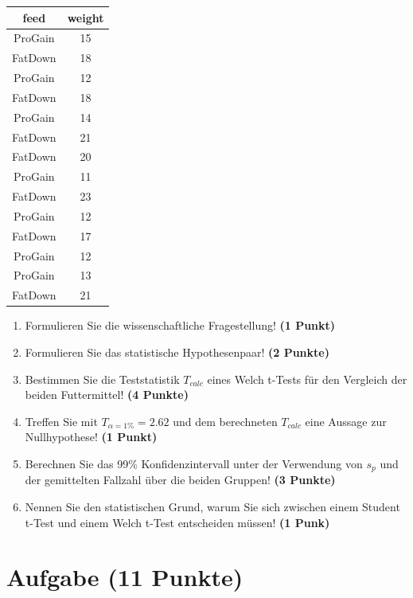 \documentclass[a4paper, 9pt]{scrartcl}\usepackage[]{graphicx}\usepackage[]{xcolor}
\begin{document}
\begin{table}[!h]
\centering
\begin{tabular}{cc}
\toprule
feed & weight\\
\midrule
ProGain & 15\\
FatDown & 18\\
ProGain & 12\\
FatDown & 18\\
ProGain & 14\\
\addlinespace
FatDown & 21\\
FatDown & 20\\
ProGain & 11\\
FatDown & 23\\
ProGain & 12\\
\addlinespace
FatDown & 17\\
ProGain & 12\\
ProGain & 13\\
FatDown & 21\\
\bottomrule
\end{tabular}
\end{table}



\begin{enumerate}
  \item Formulieren Sie die wissenschaftliche Fragestellung! \textbf{(1 Punkt)}
  \item Formulieren Sie das statistische Hypothesenpaar! \textbf{(2
      Punkte)}
  \item Bestimmen Sie die Teststatistik $T_{calc}$ eines Welch t-Tests f{\"u}r den
  Vergleich der beiden Futtermittel! \textbf{(4 Punkte)}
\item Treffen Sie mit $T_{\alpha = 1\%} = 2.62$ und dem berechneten $T_{calc}$ eine Aussage
  zur Nullhypothese! \textbf{(1 Punkt)}
\item Berechnen Sie das 99\% Konfidenzintervall unter der
  Verwendung von $s_p$ und der gemittelten Fallzahl {\"u}ber die beiden Gruppen! \textbf{(3 Punkte)}
\item Nennen Sie den statistischen Grund, warum Sie sich zwischen einem Student t-Test und einem
  Welch t-Test entscheiden m{\"u}ssen! \textbf{(1 Punk)}
\end{enumerate} 
\clearpage

\section{Aufgabe \hfill (11 Punkte)}
\end{document}
